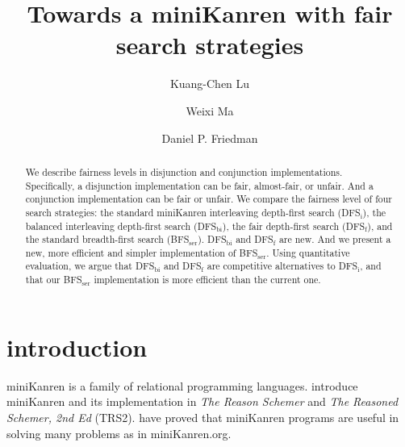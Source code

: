 \documentclass[format=acmlarge, review=true, authordraft=true]{acmart}
\title{Towards a miniKanren with fair search strategies}
\author{Kuang-Chen Lu}
\affiliation{Indiana University}
\author{Weixi Ma}
\affiliation{Indiana University}
\author{Daniel P. Friedman}
\affiliation{Indiana University}
\newcommand{\conde}{\texttt{cond$^e$}}
\newcommand{\conj}{\texttt{conj}}
\newcommand{\disj}{\texttt{disj}}
\newcommand{\DFSi }[0]{DFS$_\textrm{i}$}
\newcommand{\DFSf }[0]{DFS$_\textrm{f}$}
\newcommand{\DFSbi}[0]{DFS$_\textrm{bi}$}
\newcommand{\BFSser}[0]{BFS$_\textrm{ser}$}
\begin{document}

\begin{abstract}

We describe fairness levels in disjunction and conjunction
implementations.  Specifically, a disjunction implementation can be
fair, almost-fair, or unfair. And a conjunction implementation can
be fair or unfair.  We compare the fairness level of four search
strategies: the standard miniKanren interleaving depth-first search (\DFSi),
the balanced interleaving depth-first search (\DFSbi), the fair depth-first
search (\DFSf), and the standard breadth-first search (\BFSser).
\DFSbi{} and \DFSf{} are new. And we present a new, more efficient
and simpler implementation of \BFSser. Using quantitative evaluation, 
we argue that
\DFSbi{} and \DFSf{} are competitive alternatives to \DFSi, 
and that our \BFSser{} implementation is more efficient than the current one.

% 

\end{abstract}

\maketitle

\section{introduction}

miniKanren is a family of relational programming languages.
\citep{Friedman:2005:RS:1121583} \citet{friedman_reasoned_2018} introduce 
miniKanren and its
implementation in \emph{The Reason Schemer} 
and \emph{The Reasoned Schemer, 2nd Ed} (TRS2). \citet{byrd2017unified} have 
proved that miniKanren programs are useful in solving many problems as in 
miniKanren.org.
\end{document}
